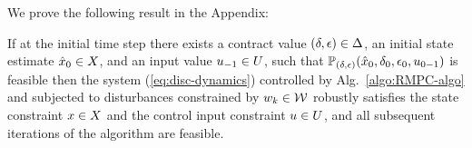 We prove the following result in the Appendix:
\begin{thm}%
	\label{thm:robust-feasible-anytime-RMPC}
	If at the initial time step there exists a contract value $(\delta,\epsilon) \in \Delta$, 
	an initial state estimate $\hat{x}_0 \in X$,
	and an input value $u_{-1} \in U$,
	such that $\mathbb{P}_{(\delta,\epsilon)}(\hat{x}_{0},\delta_{0},\epsilon_{0},u_{0 -1})$
	is feasible then the system (\ref{eq:disc-dynamics}) controlled by
	Alg.~\ref{algo:RMPC-algo} and subjected to disturbances constrained
	by $w_k \in \mathcal{W}$ robustly satisfies the state constraint $x \in X$
	and the control input constraint $u \in U$,
	and all subsequent iterations of the algorithm are feasible.
\end{thm}




